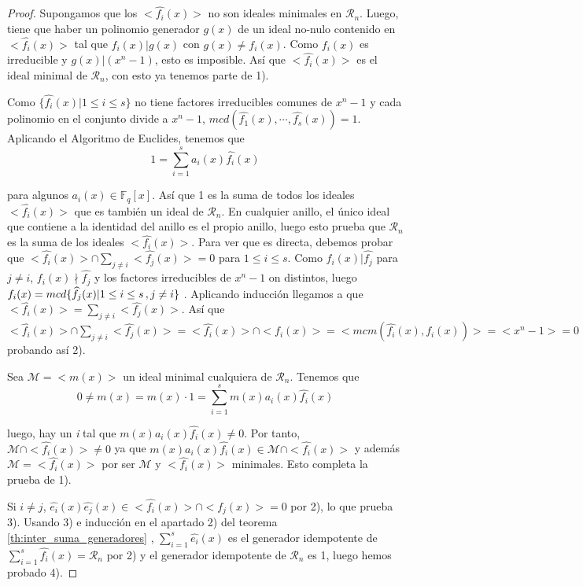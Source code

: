 \begin{proof}
Supongamos que los $<\widehat{f_i}(x)>$ no son ideales minimales en $\mathcal{R}_n$. Luego, tiene que haber un polinomio generador $g(x)$ de un ideal no-nulo contenido en $<\widehat{f_i}(x)>$ tal que $f_i(x) | g(x) $ con $g(x) \neq f_i(x)$. Como $f_i(x)$ es irreducible y $ g(x)| (x^n-1) $, esto es imposible. Así que $<\widehat{f_i}(x)>$ es el ideal minimal de $\mathcal{R}_n$, con esto ya tenemos parte de 1).

Como $\{ \widehat{f_i}(x) | 1 \leq i \leq s \}$ no tiene factores irreducibles comunes de $x^n-1$ y cada polinomio en el conjunto divide a $x^n-1$, $mcd(\widehat{f_1}(x), \cdots , \widehat{f_s}(x) ) = 1 $. Aplicando el Algoritmo de Euclides, tenemos que 
\begin{equation}
	1 = \sum_{i=1}^s a_i(x)\widehat{f_i}(x)
\end{equation}

para algunos $a_i(x) \in \mathbb{F}_q[x]$. Así que 1 es la suma de todos los ideales $<\widehat{f_i}(x)>$  que es también un ideal de $\mathcal{R}_n$. En cualquier anillo, el único ideal que contiene a la identidad del anillo es el propio anillo, luego esto prueba que $\mathcal{R}_n$ es la suma de los ideales $<\widehat{f_i}(x)>$. Para ver que es directa, debemos probar que $<\widehat{f_i}(x)> \cap \sum_{j \neq i} <\widehat{f_j}(x)> = { 0 }$ para $1 \leq i \leq s$. Como $f_i(x) | \widehat{f_j} $ para $j \neq i $, $f_i(x) \nmid \widehat{f_j} $ y los factores irreducibles de $x^n-1$ on distintos, luego $f_i(x) = mcd \{ \widehat{f_j}(x) | 1 \leq i \leq s \thinspace , j \neq i \}$ . Aplicando inducción llegamos a que $<\widehat{f_i}(x)> = \sum_{j \neq i} <\widehat{f_j}(x)> $. Así que $<\widehat{f_i}(x)> \cap \sum_{j \neq i} <\widehat{f_j}(x)> = <\widehat{f_i}(x)> \cap <f_i(x)> = <mcm(\widehat{f_i}(x),f_i(x))> = <x^n-1> = { 0 }$ probando así 2).

Sea $\mathcal{M} = <m(x)>$ un ideal minimal cualquiera de  $\mathcal{R}_n$. Tenemos que 
\[
0 \neq m(x) = m(x) \cdot 1 = \sum_{i=1}^s m(x)a_i(x)\widehat{f_i}(x)
\]

luego, hay un \textit{i} tal que $m(x)a_i(x)\widehat{f_i}(x) \neq 0$. Por tanto, $\mathcal{M} \cap <\widehat{f_i}(x)> \neq {0}$ ya que $m(x)a_i(x)\widehat{f_i}(x) \in \mathcal{M} \cap <\widehat{f_i}(x)>$ y además $\mathcal{M} = <\widehat{f_i}(x)>$ por ser $\mathcal{M}$ y $<\widehat{f_i}(x)>$ minimales. Esto completa la prueba de 1).

Si $ i \neq j$, $\widehat{e_i}(x)\widehat{e_j}(x) \in <\widehat{f_i}(x)> \cap <\widehat{f_j}(x)> = {0}$ por 2), lo que prueba 3). Usando 3) e inducción en el apartado 2) del teorema \ref{th:inter_suma_generadores} , $\sum_{i=1}^s \widehat{e_i}(x)$ es el generador idempotente de $\sum_{i=1}^s \widehat{f_i}(x) = \mathcal{R}_n$ por 2) y el generador idempotente de $\mathcal{R}_n$ es 1, luego hemos probado 4). 


\end{proof}

